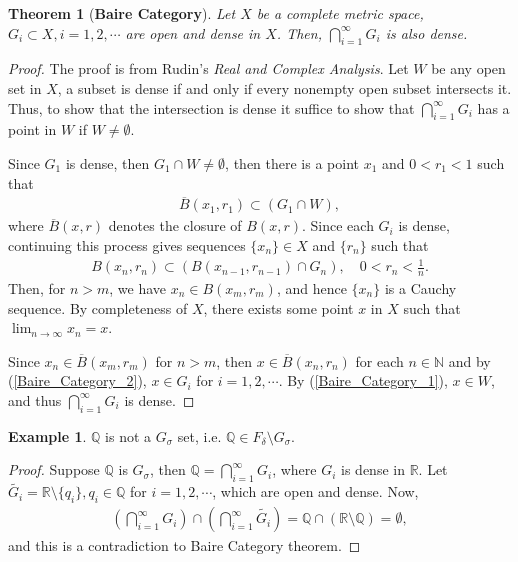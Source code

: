 \documentclass[11pt]{book}
\newtheorem{theorem}{Theorem}[chapter]
\theoremstyle{definition}
\newtheorem{example}{Example}[chapter]
\numberwithin{equation}{chapter}
\begin{document}
\begin{theorem}[{\bf Baire Category}]
Let $X$ be a complete metric space, $G_i \subset X, i = 1,2,\cdots$ are open and dense in $X$. Then, $\bigcap^\infty_{i=1} G_i$ is also dense.
\end{theorem}
\begin{proof}
The proof is from Rudin's {\em Real and Complex Analysis}\cite{2}. Let $W$ be any open set in $X$, a subset is dense if and only if every nonempty open subset intersects it. Thus, to show that the intersection is dense it suffice to show that $\bigcap^\infty_{i=1} G_i$ has a point in $W$ if $W \neq \emptyset$.

Since $G_1$ is dense, then $G_1 \cap W \neq \emptyset$, then there is a point $x_1$ and $0 < r_1 < 1$ such that
\begin{align}\label{Baire_Category_1}
    \overline{B}\left(x_1,r_1\right) \subset (G_1 \cap W),
\end{align}
where $\overline{B}(x,r)$ denotes the closure of $B(x,r)$. Since each $G_i$ is dense, continuing this process gives sequences $\{x_n\} \in X$ and $\{r_n\}$ such that 
\begin{align}\label{Baire_Category_2}
    B\left(x_n,r_n\right) \subset \left( B\left(x_{n-1},r_{n-1}\right) \cap G_n \right), \quad 0 < r_n < \frac{1}{n}.
\end{align}
Then, for $n > m$, we have $x_n \in B(x_m,r_m)$, and hence $\{x_n\}$ is a Cauchy sequence. By completeness of $X$, there exists some point $x$ in $X$ such that $\lim_{n\to\infty} x_n = x$.

Since $x_n \in \overline{B}(x_m,r_m)$ for $n > m$, then $x \in \overline{B}(x_n,r_n)$ for each $n \in \mathbb{N}$ and by (\ref{Baire_Category_2}), $x \in G_i$ for $i = 1,2,\cdots$. By (\ref{Baire_Category_1}), $x \in W$, and thus $\bigcap^\infty_{i=1} G_i$ is dense. 
\end{proof}

\medskip

\begin{example}
$\mathbb{Q}$ is not a $G_\sigma$ set, i.e. $\mathbb{Q} \in F_\delta \setminus G_\sigma$.
\end{example}
\begin{proof}
Suppose $\mathbb{Q}$ is $G_\sigma$, then $\mathbb{Q} = \bigcap^\infty_{i=1} G_i$, where $G_i$ is dense in $\mathbb{R}$. Let $\widetilde{G_i} = \mathbb{R} \setminus \{q_i\}, q_i \in \mathbb{Q}$ for $i = 1,2,\cdots$, which are open and dense. Now,
\begin{align*}
    \left(\bigcap^\infty_{i=1}G_i\right) \cap \left(\bigcap^\infty_{i=1}\widetilde{G_i}\right) = \mathbb{Q} \cap (\mathbb{R} \setminus \mathbb{Q}) = \emptyset,
\end{align*}
and this is a contradiction to Baire Category theorem.
\end{proof}
\end{document}
